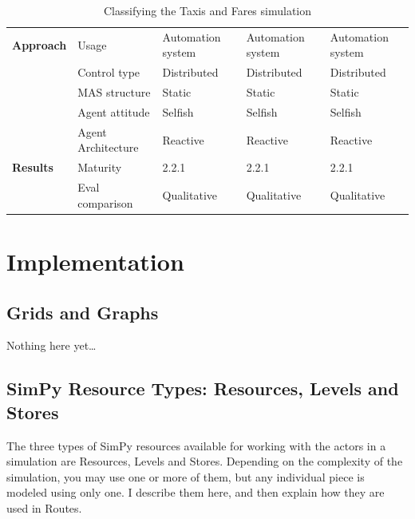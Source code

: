 \documentclass[11pt,letterpaper,onecolumn,twoside,openright,final]{report}
\begin{document}
\begin{table}[htbp]
\begin{tabular}{p{}p{}p{}p{}p{}}
        \hline
        \textbf{Approach} & Usage & Automation system & Automation system & Automation system \\
        \cline{2-5} & Control type & Distributed & Distributed & Distributed \\
        \cline{2-5} & MAS structure & Static & Static & Static \\
        \cline{2-5} & Agent attitude & Selfish & Selfish & Selfish \\
        \cline{2-5} & \begin{minipage}[t]{2.3cm}Agent \newline Architecture\end{minipage} & Reactive & Reactive & Reactive \\[2.5ex]
        \hline
        \textbf{Results} & Maturity & 2.2.1 & 2.2.1 & 2.2.1 \\
        \cline{2-5} & Eval comparison & Qualitative & Qualitative & Qualitative \\
        \hline
        \end{tabular}%
        \caption{Classifying the Taxis and Fares simulation}
    \label{tab:classifying-taxis-and-fares-sim}%
\end{table}%



\chapter{Implementation}
\section{Grids and Graphs}
Nothing here yet\ldots


\section{SimPy Resource Types: Resources, Levels and Stores}
The three types of SimPy resources available for working with the actors in a simulation are Resources, Levels and Stores.
Depending on the complexity of the simulation, you may use one or more of them, but any individual piece is modeled using only one.
I describe them here, and then explain how they are used in Routes.
\end{document}
